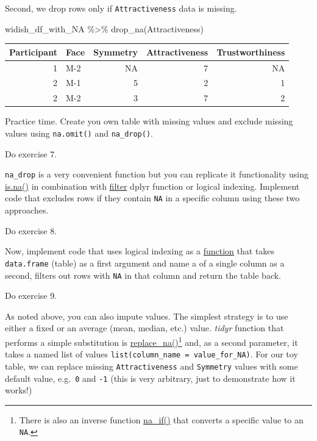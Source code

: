 \documentclass[
]{book}
\newenvironment{Shaded}{\begin{snugshade}}{\end{snugshade}}
\newcommand{\FunctionTok}[1]{\textcolor[rgb]{0.00,0.00,0.00}{#1}}
\newcommand{\NormalTok}[1]{#1}
\newcommand{\SpecialCharTok}[1]{\textcolor[rgb]{0.00,0.00,0.00}{#1}}
\begin{document}
Second, we drop rows only if \texttt{Attractiveness} data is missing.

\begin{Shaded}
\begin{Highlighting}[]
\NormalTok{widish\_df\_with\_NA }\SpecialCharTok{\%\textgreater{}\%}
  \FunctionTok{drop\_na}\NormalTok{(Attractiveness)}
\end{Highlighting}
\end{Shaded}

\begin{tabular}{r|l|r|r|r}
\hline
Participant & Face & Symmetry & Attractiveness & Trustworthiness\\
\hline
1 & M-2 & NA & 7 & NA\\
\hline
2 & M-1 & 5 & 2 & 1\\
\hline
2 & M-2 & 3 & 7 & 2\\
\hline
\end{tabular}

Practice time. Create you own table with missing values and exclude missing values using \texttt{na.omit()} and \texttt{na\_drop()}.

Do exercise 7.

\texttt{na\_drop} is a very convenient function but you can replicate it functionality using \href{https://stat.ethz.ch/R-manual/R-devel/library/base/html/NA.html}{is.na()} in combination with \protect\hyperlink{filter}{filter} dplyr function or logical indexing. Implement code that excludes rows if they contain \texttt{NA} in a specific column using these two approaches.

Do exercise 8.

Now, implement code that uses logical indexing as a \protect\hyperlink{seminar05}{function} that takes \texttt{data.frame} (table) as a first argument and name a of a single column as a second, filters out rows with \texttt{NA} in that column and return the table back.

Do exercise 9.

As noted above, you can also impute values. The simplest strategy is to use either a fixed or an average (mean, median, etc.) value. \emph{tidyr} function that performs a simple substitution is \href{https://tidyr.tidyverse.org/reference/replace_na.html}{replace\_na()}\footnote{There is also an inverse function \href{https://dplyr.tidyverse.org/reference/na_if.html}{na\_if()} that converts a specific value to an \texttt{NA}.} and, as a second parameter, it takes a named list of values \texttt{list(column\_name\ =\ value\_for\_NA)}. For our toy table, we can replace missing \texttt{Attractiveness} and \texttt{Symmetry} values with some default value, e.g.~\texttt{0} and \texttt{-1} (this is very arbitrary, just to demonstrate how it works!)
\end{document}
